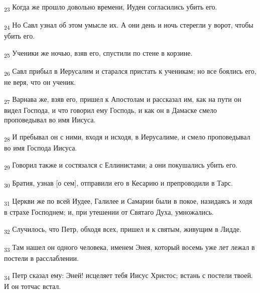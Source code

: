 \begin{tcolorbox}
\textsubscript{23} Когда же прошло довольно времени, Иудеи согласились убить его.
\end{tcolorbox}
\begin{tcolorbox}
\textsubscript{24} Но Савл узнал об этом умысле их. А они день и ночь стерегли у ворот, чтобы убить его.
\end{tcolorbox}
\begin{tcolorbox}
\textsubscript{25} Ученики же ночью, взяв его, спустили по стене в корзине.
\end{tcolorbox}
\begin{tcolorbox}
\textsubscript{26} Савл прибыл в Иерусалим и старался пристать к ученикам; но все боялись его, не веря, что он ученик.
\end{tcolorbox}
\begin{tcolorbox}
\textsubscript{27} Варнава же, взяв его, пришел к Апостолам и рассказал им, как на пути он видел Господа, и что говорил ему Господь, и как он в Дамаске смело проповедывал во имя Иисуса.
\end{tcolorbox}
\begin{tcolorbox}
\textsubscript{28} И пребывал он с ними, входя и исходя, в Иерусалиме, и смело проповедывал во имя Господа Иисуса.
\end{tcolorbox}
\begin{tcolorbox}
\textsubscript{29} Говорил также и состязался с Еллинистами; а они покушались убить его.
\end{tcolorbox}
\begin{tcolorbox}
\textsubscript{30} Братия, узнав [о сем], отправили его в Кесарию и препроводили в Тарс.
\end{tcolorbox}
\begin{tcolorbox}
\textsubscript{31} Церкви же по всей Иудее, Галилее и Самарии были в покое, назидаясь и ходя в страхе Господнем; и, при утешении от Святаго Духа, умножались.
\end{tcolorbox}
\begin{tcolorbox}
\textsubscript{32} Случилось, что Петр, обходя всех, пришел и к святым, живущим в Лидде.
\end{tcolorbox}
\begin{tcolorbox}
\textsubscript{33} Там нашел он одного человека, именем Энея, который восемь уже лет лежал в постели в расслаблении.
\end{tcolorbox}
\begin{tcolorbox}
\textsubscript{34} Петр сказал ему: Эней! исцеляет тебя Иисус Христос; встань с постели твоей. И он тотчас встал.
\end{tcolorbox}
